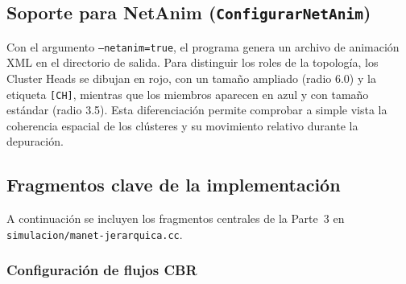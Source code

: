 \subsection{Soporte para NetAnim (\texttt{ConfigurarNetAnim})}

Con el argumento \texttt{--netanim=true}, el programa genera un archivo de animación XML en el directorio de salida. Para distinguir los roles de la topología, los Cluster Heads se dibujan en rojo, con un tamaño ampliado (radio 6.0) y la etiqueta \texttt{[CH]}, mientras que los miembros aparecen en azul y con tamaño estándar (radio 3.5). Esta diferenciación permite comprobar a simple vista la coherencia espacial de los clústeres y su movimiento relativo durante la depuración.

\subsection{Fragmentos clave de la implementación}

A continuación se incluyen los fragmentos centrales de la Parte~3 en \texttt{simulacion/manet-jerarquica.cc}.

\subsubsection{Configuración de flujos CBR}

